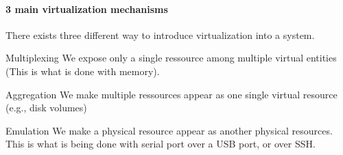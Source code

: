 \documentclass[a4paper]{book}
\begin{document}
\paragraph{3 main virtualization mechanisms}%
\label{par:3 main virtualization mechanisms}
There exists three different way to introduce virtualization into a system.
\begin{parag}{Multiplexing}
    We expose only a single ressource among multiple virtual entities (This is what is done with memory).
\end{parag}
\begin{parag}{Aggregation}
    We make multiple ressources appear as one single virtual resource (e.g., disk volumes)
\end{parag}
\begin{parag}{Emulation}
    We make a physical resource appear as another physical resources. This is what is being done with serial port over a USB port, or over SSH.
\end{parag}
\end{document}
